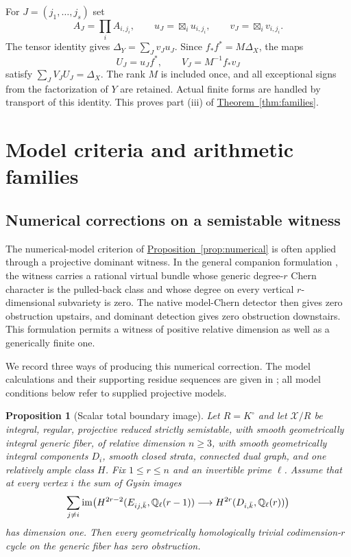 \documentclass[11pt,a4paper]{article}
\newtheorem{proposition}[theorem]{Proposition}
\theoremstyle{definition}
\theoremstyle{remark}\newtheorem{remark}[theorem]{Remark}
\numberwithin{equation}{section}
\newcommand{\Q}{\mathbb Q}\newcommand{\R}{\mathbb R}\newcommand{\C}{\mathbb C}
\newcommand{\thmref}[1]{\hyperref[#1]{\textcolor{resultlink}{Theorem~\ref*{#1}}}}
\newcommand{\propref}[1]{\hyperref[#1]{\textcolor{resultlink}{Proposition~\ref*{#1}}}}
\begin{document}
For $J=(j_1,\ldots,j_s)$ set
\[
 A_J=\prod_i A_{i,j_i},\qquad
 u_J=\boxtimes_i u_{i,j_i},\qquad v_J=\boxtimes_i v_{i,j_i}.
\]
The tensor identity gives $\Delta_Y=\sum_Jv_Ju_J$.
Since $f_*f^*=M\Delta_X$, the maps
\begin{equation}\label{eq:cyclic-diagonal}
                   U_J=u_Jf^*,\qquad V_J=M^{-1}f_*v_J
\end{equation}
satisfy $\sum_JV_JU_J=\Delta_X$. The rank $M$ is included
once, and all exceptional signs from the factorization of $Y$
are retained. Actual finite forms are handled by transport of
this identity. This proves part (iii) of \thmref{thm:families}.


\section{Model criteria and arithmetic families}\label{sec:models}

\subsection{Numerical corrections on a semistable witness}

The numerical-model criterion of \propref{prop:numerical} is often
applied through a projective dominant witness. In the general
companion formulation \cite{InternalEndpoints}, the witness carries
a rational virtual bundle whose generic degree-$r$ Chern character
is the pulled-back class and whose degree on every vertical
$r$-dimensional subvariety is zero. The native model-Chern detector
then gives zero obstruction upstairs, and dominant detection gives
zero obstruction downstairs. This formulation permits a witness
of positive relative dimension as well as a generically finite one.

We record three ways of producing this numerical correction.
The model calculations and their supporting residue sequences are
given in \cite{InternalModelCriteria}; all model conditions below
refer to supplied projective models.

\begin{proposition}[Scalar total boundary image]\label{prop:scalar-model}
Let $R=K^\circ$ and let $\mathcal X/R$ be integral, regular,
projective reduced strictly semistable, with smooth geometrically
integral generic fiber,
of relative dimension $n\geq3$, with smooth geometrically integral
components $D_i$, smooth closed strata, connected dual graph, and
one relatively ample class $H$. Fix $1\leq r\leq n$ and an
invertible prime $\ell$. Assume that at every vertex $i$ the sum
of Gysin images
\[
 \sum_{j\ne i}\im\bigl(
 H^{2r-2}(E_{ij,\bar k},\Q_\ell(r-1))
       \longrightarrow H^{2r}(D_{i,\bar k},\Q_\ell(r))\bigr)
\]
has dimension one. Then every geometrically homologically trivial
codimension-$r$ cycle on the generic fiber has zero obstruction.
\end{proposition}
\end{document}
